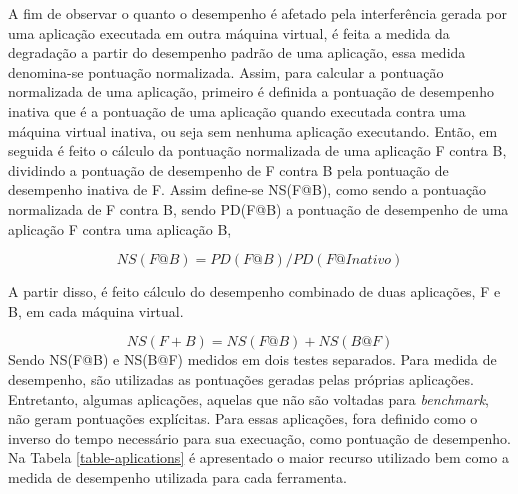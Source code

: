 \documentclass[[10pt,journal]{IEEEtran}
\begin{document}
A fim de observar o quanto o desempenho é afetado pela interferência gerada por uma aplicação executada em outra máquina virtual, é feita a medida da degradação a partir do desempenho padrão de uma aplicação, essa medida denomina-se pontuação normalizada. Assim, para calcular a pontuação normalizada de uma aplicação, primeiro é definida a pontuação de desempenho inativa que é a pontuação de uma aplicação quando executada contra uma máquina virtual inativa, ou seja sem nenhuma aplicação executando. Então, em seguida é feito o cálculo da pontuação normalizada de uma aplicação F contra B, dividindo a pontuação de desempenho de F contra B pela pontuação de desempenho inativa de F. Assim define-se NS(F@B), como sendo a pontuação normalizada de F contra B, sendo PD(F@B) a pontuação de desempenho de uma aplicação F contra uma aplicação B,

\begin{equation}
\label{eq:degradation}
NS(F@B) = PD(F@B)/PD(F@Inativo)
\end{equation}

A partir disso, é feito cálculo do desempenho combinado de duas aplicações, F e B, em cada máquina virtual.

\begin{equation}
\label{eq:combined}
NS ( F + B ) = NS ( F @ B ) + NS ( B @ F )
\end{equation}
Sendo NS(F@B) e  NS(B@F) medidos em dois testes separados. Para medida de desempenho, são utilizadas as pontuações geradas pelas próprias aplicações. Entretanto, algumas aplicações, aquelas que não são voltadas para \textit{benchmark}, não geram pontuações explícitas. Para essas aplicações, fora definido como o inverso do tempo necessário para sua execuação, como pontuação de desempenho. Na Tabela \ref{table-aplications} é apresentado o maior recurso utilizado bem como a medida de desempenho utilizada para cada ferramenta.
\end{document}
